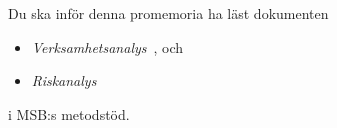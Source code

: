 Du ska inför denna promemoria ha läst dokumenten
\begin{itemize}
  \item \emph{Verksamhetsanalys}~\cite{MSB2011v}, och
  \item \emph{Riskanalys}~\cite{MSB2011r}
\end{itemize}
i MSB:s metodstöd.
